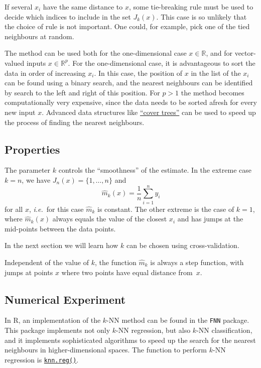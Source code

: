 \documentclass[
  a4paper,
]{article}
\theoremstyle{definition}
\theoremstyle{definition}
\theoremstyle{definition}
\theoremstyle{definition}
\theoremstyle{remark}
\begin{document}
If several \(x_i\) have the same distance to \(x\), some tie-breaking rule
must be used to decide which indices to include in the set \(J_k(x)\).
This case is so unlikely that the choice of rule is not important. One
could, for example, pick one of the tied neighbours at random.

The method can be used both for the one-dimensional case \(x\in\mathbb{R}\), and
for vector-valued inputs \(x\in\mathbb{R}^p\). For the one-dimensional case, it is
advantageous to sort the data in order of increasing \(x_i\). In this
case, the position of \(x\) in the list of the \(x_i\) can be found using a
binary search, and the nearest neighbours can be identified by search to
the left and right of this position. For \(p > 1\) the method becomes
computationally very expensive, since the data needs to be sorted afresh
for every new input \(x\). Advanced data structures like \href{https://en.wikipedia.org/wiki/Cover_tree}{``cover trees''} can
be used to speed up the process of finding the nearest neighbours.

\hypertarget{properties}{%
\subsection{Properties}\label{properties}}

The parameter \(k\) controls the ``smoothness'' of the estimate. In the
extreme case \(k = n\), we have \(J_n(x) = \{1, \ldots, n\}\) and
\begin{equation*}
  \hat m_k(x)
  = \frac1n \sum_{i=1}^n y_i
\end{equation*} for all \(x\), \emph{i.e.}~for this case \(\hat m_k\) is
constant. The other extreme is the case of \(k=1\), where \(\hat m_k(x)\)
always equals the value of the closest \(x_i\) and has jumps at the
mid-points between the data points.

In the next section we will learn how \(k\) can be chosen using
cross-validation.

Independent of the value of \(k\), the function \(\hat m_k\) is always a
step function, with jumps at points \(x\) where two points have equal
distance from~\(x\).

\hypertarget{numerical-experiment}{%
\subsection{Numerical Experiment}\label{numerical-experiment}}

In R, an implementation of the \(k\)-NN method can be found in the \texttt{FNN} package.
This package implements not only \(k\)-NN regression, but also \(k\)-NN
classification, and it implements sophisticated algorithms to speed up the
search for the nearest neighbours in higher-dimensional spaces. The function
to perform \(k\)-NN regression is
\href{https://rdrr.io/cran/FNN/man/knn.reg.html}{\texttt{knn.reg()}}.
\end{document}
